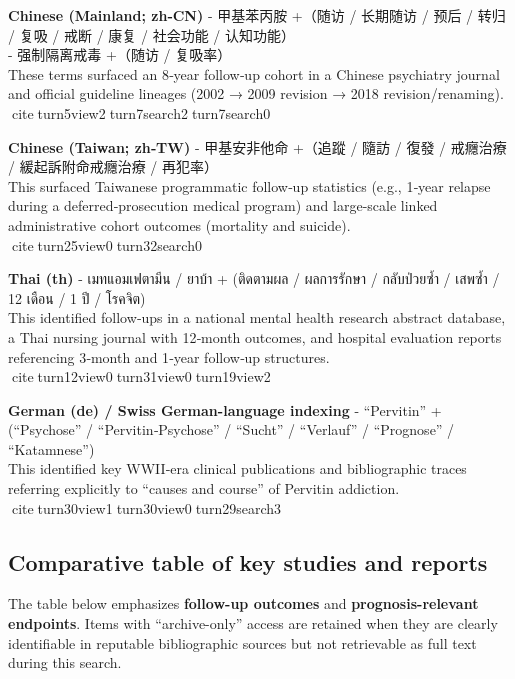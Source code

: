 \textbf{Chinese (Mainland; zh‑CN)} - 甲基苯丙胺 +（随访 / 长期随访 / 预后 / 转归 / 复吸 / 戒断 / 康复 / 社会功能 / 认知功能）\\
- 强制隔离戒毒 +（随访 / 复吸率）\\
These terms surfaced an 8‑year follow‑up cohort in a Chinese psychiatry journal and official guideline lineages (2002 → 2009 revision → 2018 revision/renaming). citeturn5view2turn7search2turn7search0

\textbf{Chinese (Taiwan; zh‑TW)} - 甲基安非他命 +（追蹤 / 隨訪 / 復發 / 戒癮治療 / 緩起訴附命戒癮治療 / 再犯率）\\
This surfaced Taiwanese programmatic follow‑up statistics (e.g., 1‑year relapse during a deferred‑prosecution medical program) and large-scale linked administrative cohort outcomes (mortality and suicide). citeturn25view0turn32search0

\textbf{Thai (th)} - เมทแอมเฟตามีน / ยาบ้า + (ติดตามผล / ผลการรักษา / กลับป่วยซ้ำ / เสพซ้ำ / 12 เดือน / 1 ปี / โรคจิต)\\
This identified follow‑ups in a national mental health research abstract database, a Thai nursing journal with 12‑month outcomes, and hospital evaluation reports referencing 3‑month and 1‑year follow‑up structures. citeturn12view0turn31view0turn19view2

\textbf{German (de) / Swiss German-language indexing} - ``Pervitin'' + (``Psychose'' / ``Pervitin‑Psychose'' / ``Sucht'' / ``Verlauf'' / ``Prognose'' / ``Katamnese'')\\
This identified key WWII‑era clinical publications and bibliographic traces referring explicitly to ``causes and course'' of Pervitin addiction. citeturn30view1turn30view0turn29search3

\subsection{Comparative table of key studies and reports}\label{13_non_english-comparative-table-of-key-studies-and-reports}

The table below emphasizes \textbf{follow-up outcomes} and \textbf{prognosis-relevant endpoints}. Items with ``archive-only'' access are retained when they are clearly identifiable in reputable bibliographic sources but not retrievable as full text during this search.

